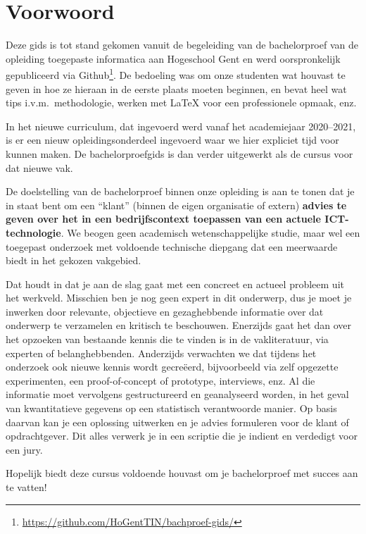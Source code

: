 \chapter*{Voorwoord}
\label{ch:voorwoord}

Deze gids is tot stand gekomen vanuit de begeleiding van de bachelorproef van de opleiding toegepaste informatica aan Hogeschool Gent en werd oorspronkelijk gepubliceerd via Github\footnote{\url{https://github.com/HoGentTIN/bachproef-gids/}}. De bedoeling was om onze studenten wat houvast te geven in hoe ze hieraan in de eerste plaats moeten beginnen, en bevat heel wat tips i.v.m.\ methodologie, werken met {\LaTeX} voor een professionele opmaak, enz.

In het nieuwe curriculum, dat ingevoerd werd vanaf het academiejaar 2020--2021, is er een nieuw opleidingsonderdeel ingevoerd waar we hier expliciet tijd voor kunnen maken. De bachelorproefgids is dan verder uitgewerkt als de cursus voor dat nieuwe vak.

De doelstelling van de bachelorproef binnen onze opleiding is aan te tonen dat je in staat bent om een ``klant'' (binnen de eigen organisatie of extern) \textbf{advies te geven over het in een bedrijfscontext toepassen van een actuele ICT-technologie}. We beogen geen academisch wetenschappelijke studie, maar wel een toegepast onderzoek met voldoende technische diepgang dat een meerwaarde biedt in het gekozen vakgebied.

Dat houdt in dat je aan de slag gaat met een concreet en actueel probleem uit het werkveld. Misschien ben je nog geen expert in dit onderwerp, dus je moet je inwerken door relevante, objectieve en gezaghebbende informatie over dat onderwerp te verzamelen en kritisch te beschouwen. Enerzijds gaat het dan over het opzoeken van bestaande kennis die te vinden is in de vakliteratuur, via experten of belanghebbenden. Anderzijds verwachten we dat tijdens het onderzoek ook nieuwe kennis wordt gecreëerd, bijvoorbeeld via zelf opgezette experimenten, een proof-of-concept of prototype, interviews, enz. Al die informatie moet vervolgens gestructureerd en geanalyseerd worden, in het geval van kwantitatieve gegevens op een statistisch verantwoorde manier. Op basis daarvan kan je een oplossing uitwerken en je advies formuleren voor de klant of opdrachtgever. Dit alles verwerk je in een scriptie die je indient en verdedigt voor een jury.

Hopelijk biedt deze cursus voldoende houvast om je bachelorproef met succes aan te vatten!
